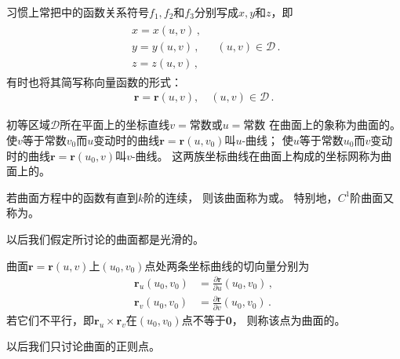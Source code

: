 习惯上常把中的函数关系符号$f_1,f_2$和$f_3$分别写成$x,y$和$z$，即
\begin{align}\label{eq:03ex01.10}
    \begin{array}{l}
        x=x(u,v)\, , \\
        y=y(u,v)\, , \\
        z=z(u,v)\, ,
    \end{array}\quad (u,v)\in \mathscr{D}\, .
\end{align}
有时也将其简写称向量函数的形式：
\begin{align}\label{eq:03ex01.11}
    \bm r=\bm r(u,v),\quad (u,v)\in \mathscr{D}\, .
\end{align}

\begin{definition}
    初等区域$\mathscr{D}$所在平面上的坐标直线$v=$常数或$u=$常数
    在曲面上的象称为曲面的。
    使$v$等于常数$v_0$而$u$变动时的曲线$\bm r=\bm r(u,v_0)$叫$u$-曲线；
    使$u$等于常数$u_0$而$v$变动时的曲线$\bm r=\bm r(u_0,v)$叫$v$-曲线。
    这两族坐标曲线在曲面上构成的坐标网称为曲面上的。
\end{definition}

\begin{definition}
    若曲面方程中的函数有直到$k$阶的连续，
    则该曲面称为或。
    特别地，$C^1$阶曲面又称为。
\end{definition}

以后我们假定所讨论的曲面都是光滑的。

\begin{definition}
    曲面$\bm r=\bm r(u,v)$上$(u_0,v_0)$点处两条坐标曲线的切向量分别为
    \begin{align}\label{eq:03ex01.12}
        \bm r_u(u_0,v_0) & =\frac{\partial \bm r}{\partial u}(u_0,v_0)\, , \\
        \bm r_v(u_0,v_0) & =\frac{\partial \bm r}{\partial v}(u_0,v_0)\, .
    \end{align}
    若它们不平行，即$\bm r_u\times\bm r_v$在$(u_0,v_0)$点不等于$\bm 0$，
    则称该点为曲面的。
\end{definition}

以后我们只讨论曲面的正则点。

